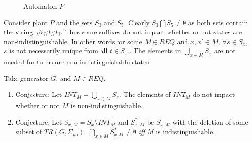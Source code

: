 \documentclass{article}
\begin{document}
				\begin{figure}[ht]
					\begin{minipage}[b]{\linewidth}
					\centering
					    \caption{Automaton $P$}
					    \label{CounterExampleAutomaton}
					\end{minipage}
				\end{figure}

				Consider plant $P$ and the sets $S_3$ and $S_5$. Clearly $S_3 \bigcap S_5 \neq \emptyset$ as both sets contain the string $\gamma\beta\gamma\beta\gamma\beta\gamma$. Thus some suffixes do not impact whether or not states are non-indistinguishable. In other words for some $M \in REQ$ and $x,x' \in M$, $\forall s \in S_x$, $s$ is not necessarily unique from all $t \in S_{x'}$. The elements in $\bigcup_{x \in M} S_x$ are not needed for to ensure non-indistinguishable states.

				Take generator $G$, and $M \in REQ$.

				\begin{enumerate}
					\item Conjecture: Let $INT_M = \bigcup_{x \in M} S_x$. The elements of $INT_M$ do not impact whether or not $M$ is non-indistinguishable. 
					\item Conjecture: Let $S_{x,M} = S_x \setminus INT_M$ and $S_{x,M}^*$ be $S_{x,M}$ with the deletion of some subset of $TR(G,\Sigma_{uo})$. $\bigcap_{x \in M} S_{x,M}^* \neq \emptyset$ \emph{iff} $M$ is indistinguishable.
				\end{enumerate}
\end{document}
